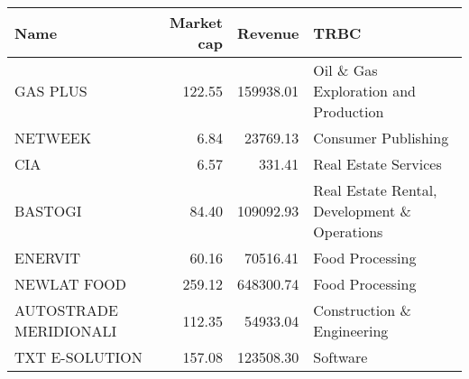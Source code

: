 \begin{tabular}{lrrl}
\toprule
                  Name &  Market cap &   Revenue &                                         TRBC \\
\midrule
              GAS PLUS &      122.55 & 159938.01 &         Oil \& Gas Exploration and Production \\
               NETWEEK &        6.84 &  23769.13 &                          Consumer Publishing \\
                   CIA &        6.57 &    331.41 &                         Real Estate Services \\
               BASTOGI &       84.40 & 109092.93 & Real Estate Rental, Development \& Operations \\
               ENERVIT &       60.16 &  70516.41 &                              Food Processing \\
           NEWLAT FOOD &      259.12 & 648300.74 &                              Food Processing \\
AUTOSTRADE MERIDIONALI &      112.35 &  54933.04 &                   Construction \& Engineering \\
        TXT E-SOLUTION &      157.08 & 123508.30 &                                     Software \\
\bottomrule
\end{tabular}
